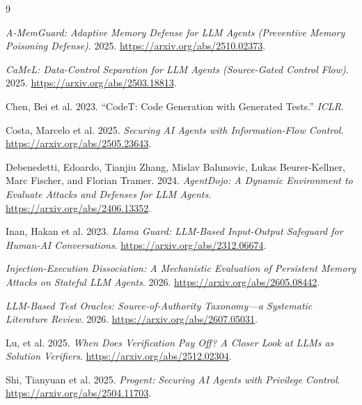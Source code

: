 \documentclass[11pt]{article}
\begin{document}
\begin{thebibliography}{9}


\emph{A-MemGuard: Adaptive Memory Defense for LLM Agents (Preventive Memory Poisoning Defense)}. 2025. \url{https://arxiv.org/abs/2510.02373}.


\emph{CaMeL: Data-Control Separation for LLM Agents (Source-Gated Control Flow)}. 2025. \url{https://arxiv.org/abs/2503.18813}.


{Chen, Bei et al.} 2023. {``CodeT: Code Generation with Generated Tests.''} \emph{ICLR}.


{Costa, Marcelo et al.} 2025. \emph{Securing AI Agents with Information-Flow Control}. \url{https://arxiv.org/abs/2505.23643}.


Debenedetti, Edoardo, Tianjiu Zhang, Mislav Balunovic, Lukas Beurer-Kellner, Marc Fischer, and Florian Tramer. 2024. \emph{AgentDojo: A Dynamic Environment to Evaluate Attacks and Defenses for LLM Agents}. \url{https://arxiv.org/abs/2406.13352}.


{Inan, Hakan et al.} 2023. \emph{Llama Guard: LLM-Based Input-Output Safeguard for Human-AI Conversations}. \url{https://arxiv.org/abs/2312.06674}.


\emph{Injection-Execution Dissociation: A Mechanistic Evaluation of Persistent Memory Attacks on Stateful LLM Agents}. 2026. \url{https://arxiv.org/abs/2605.08442}.


\emph{LLM-Based Test Oracles: Source-of-Authority Taxonomy---a Systematic Literature Review}. 2026. \url{https://arxiv.org/abs/2607.05031}.


{Lu, et al.} 2025. \emph{When Does Verification Pay Off? A Closer Look at LLMs as Solution Verifiers}. \url{https://arxiv.org/abs/2512.02304}.


{Shi, Tianyuan et al.} 2025. \emph{Progent: Securing AI Agents with Privilege Control}. \url{https://arxiv.org/abs/2504.11703}.


\end{thebibliography}
\end{document}
